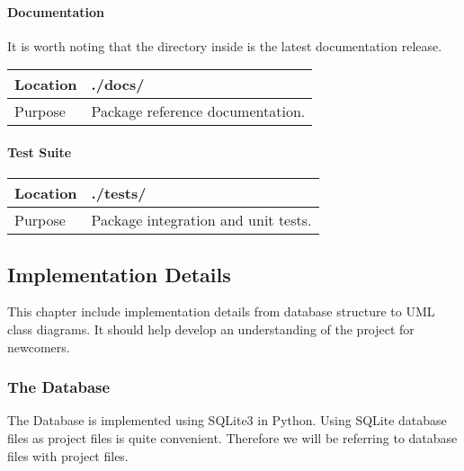 \documentclass[letterpaper,10pt,english]{sphinxmanual}
\begin{document}
\paragraph{Documentation}
\label{\detokenize{structure:documentation}}
It is worth noting that the  directory inside  is the latest documentation release.


\begin{savenotes}\sphinxattablestart
\centering
\begin{tabulary}{\linewidth}[t]{|T|T|}
\hline

Location
&
./docs/
\\
\hline
Purpose
&
Package reference documentation.
\\
\hline
\end{tabulary}
\par
\sphinxattableend\end{savenotes}


\paragraph{Test Suite}
\label{\detokenize{structure:test-suite}}

\begin{savenotes}\sphinxattablestart
\centering
\begin{tabulary}{\linewidth}[t]{|T|T|}
\hline

Location
&
./tests/
\\
\hline
Purpose
&
Package integration and unit tests.
\\
\hline
\end{tabulary}
\par
\sphinxattableend\end{savenotes}


\subsection{Implementation Details}
\label{\detokenize{implementation:implementation-details}}\label{\detokenize{implementation::doc}}
This chapter include implementation details from database structure to UML class diagrams.
It should help develop an understanding of the project for newcomers.


\subsubsection{The Database}
\label{\detokenize{implementation:the-database}}
The Database is implemented using SQLite3 in Python. Using SQLite database files as project files is quite convenient.
Therefore we will be referring to database files with project files.
\end{document}
